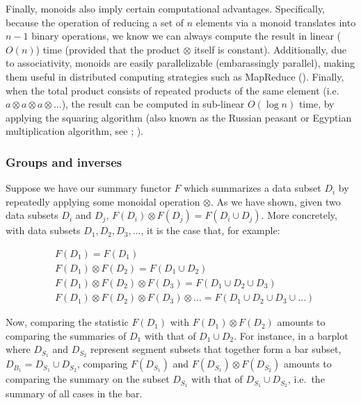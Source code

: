\documentclass[
  openany]{book}
\theoremstyle{definition}
\theoremstyle{definition}
\theoremstyle{definition}
\theoremstyle{definition}
\theoremstyle{remark}
\begin{document}
Finally, monoids also imply certain computational advantages. Specifically, because the operation of reducing a set of \(n\) elements via a monoid translates into \(n - 1\) binary operations, we know we can always compute the result in linear (\(O(n)\)) time (provided that the product \(\otimes\) itself is constant). Additionally, due to associativity, monoids are easily parallelizable (embarassingly parallel), making them useful in distributed computing strategies such as MapReduce (). Finally, when the total product consists of repeated products of the same element (i.e.~\(a \otimes a \otimes a \otimes \ldots\)), the result can be computed in sub-linear \(O(\log n)\) time, by applying the squaring algorithm (also known as the Russian peasant or Egyptian multiplication algorithm, see ; ).

\subsubsection{Groups and inverses}\label{groups-inverses}

Suppose we have our summary functor \(F\) which summarizes a data subset \(D_i\) by repeatedly applying some monoidal operation \(\otimes\). As we have shown, given two data subsets \(D_i\) and \(D_j\), \(F(D_i) \otimes F(D_j) = F(D_i \cup D_j)\). More concretely, with data subsets \(D_1, D_2, D_3, \ldots\), it is the case that, for example:

\begin{align}
&F(D_1) = F(D_1) \\
&F(D_1) \otimes F(D_2) = F(D_1 \cup D_2) \\
&F(D_1) \otimes F(D_2) \otimes F(D_3) = F(D_1 \cup D_2 \cup D_3) \\
&F(D_1) \otimes F(D_2) \otimes F(D_3) \otimes \ldots = F(D_1 \cup D_2 \cup D_3 \cup \ldots)
\end{align}

Now, comparing the statistic \(F(D_1)\) with \(F(D_1) \otimes F(D_2)\) amounts to comparing the summaries of \(D_1\) with that of \(D_1 \cup D_2\). For instance, in a barplot where \(D_{S_1}\) and \(D_{S_2}\) represent segment subsets that together form a bar subset, \(D_{B_1} = D_{S_1} \cup D_{S_2}\), comparing \(F(D_{S_1})\) and \(F(D_{S_1}) \otimes F(D_{S_2})\) amounts to comparing the summary on the subset \(D_{S_1}\) with that of \(D_{S_1} \cup D_{S_2}\), i.e.~the summary of all cases in the bar.
\end{document}
